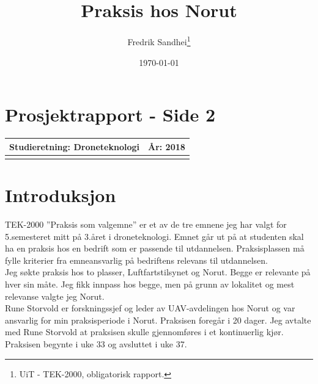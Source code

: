 \documentclass[12pt, a4paper]{article}
\begin{document}
\title{\\Praksis hos Norut}
\author{Fredrik Sandhei\thanks{UiT - TEK-2000, obligatorisk rapport.}}

\date{\today}
\maketitle
\clearpage
\section{Prosjektrapport - Side 2}

\begin{tabular}{ | l | l | }
	\hline
	\textbf{Studieretning: Droneteknologi}\hspace{5cm} & \textbf{År: 2018} \\
	\hline
	\vspace{1cm}
	\hline
\end{tabular}


\clearpage
\begin{minipage}[b]{1\linewidth}
	\tableofcontents
	\vspace{.5cm}
\end{minipage}
\begin{minipage}[b]{1\linewidth}
	\listoffigures
\end{minipage}
\clearpage

\section{Introduksjon}
TEK-2000 ''Praksis som valgemne'' er et av de tre emnene jeg har valgt for 5.semesteret mitt på 3.året i droneteknologi. Emnet går ut på at studenten skal ha en praksis hos en bedrift som er passende til utdannelsen. Praksisplassen må fylle kriterier fra emneansvarlig på bedriftens relevans til utdannelsen. \\


Jeg søkte praksis hos to plasser, Luftfartstilsynet og Norut. Begge er relevante på hver sin måte. Jeg fikk innpass hos begge, men på grunn av lokalitet og mest relevanse valgte jeg Norut.\\

Rune Storvold er forskningssjef og leder av UAV-avdelingen hos Norut og var ansvarlig for min praksisperiode i Norut. Praksisen foregår i 20 dager. Jeg avtalte med Rune Storvold at praksisen skulle gjennomføres i et kontinuerlig kjør. Praksisen begynte i uke 33 og avsluttet i uke 37.\\
\end{document}
